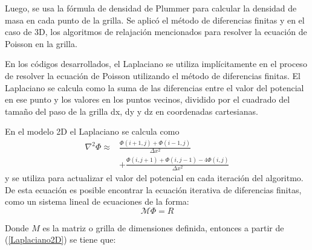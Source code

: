 \documentclass[reprint,amsmath,amssymb,aps]{revtex4-2}
\begin{document}
Luego, se usa la fórmula de densidad de Plummer para calcular la densidad de masa en cada punto de la grilla. Se aplicó el método de diferencias finitas y en el caso de 3D, los algoritmos de relajación mencionados para resolver la ecuación de Poisson en la grilla.

En los códigos desarrollados, el Laplaciano se utiliza implícitamente en el proceso de resolver la ecuación de Poisson utilizando el método de diferencias finitas. El Laplaciano se calcula como la suma de las diferencias entre el valor del potencial en ese punto y los valores en los puntos vecinos, dividido por el cuadrado del tamaño del paso de la grilla dx, dy y dz en coordenadas cartesianas\cite{laplacian}.

En el modelo 2D el Laplaciano se calcula como
\begin{equation}\label{Laplaciano2D}
\begin{split}
\nabla^2 \Phi \approx & \frac{\Phi(i+1, j) + \Phi(i-1, j)}{\Delta x^2} \\
& + \frac{\Phi(i, j+1) + \Phi(i, j-1) - 4\Phi(i, j)}{\Delta x^2}
\end{split}
\end{equation}
y se utiliza para actualizar el valor del potencial en cada iteración del algoritmo.
De esta ecuación es posible encontrar la ecuación iterativa de diferencias finitas, como un sistema lineal de ecuaciones de la forma:
\begin{equation}
    \mathcal{M} \Phi = R
    \label{kan:1}
\end{equation}

Donde $M$ es la matriz o grilla de dimensiones definida, entonces a partir de (\ref{Laplaciano2D}) se tiene que:
\end{document}
